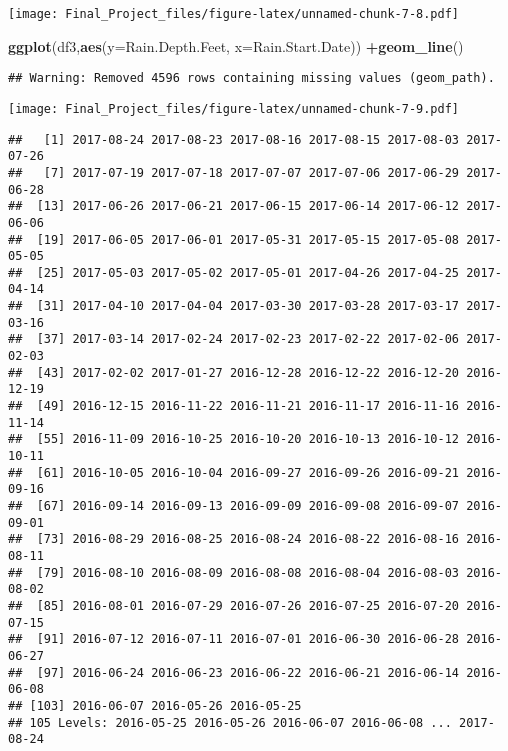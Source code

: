 \documentclass[
]{article}
\newenvironment{Shaded}{\begin{snugshade}}{\end{snugshade}}
\newcommand{\DataTypeTok}[1]{\textcolor[rgb]{0.13,0.29,0.53}{#1}}
\newcommand{\KeywordTok}[1]{\textcolor[rgb]{0.13,0.29,0.53}{\textbf{#1}}}
\newcommand{\NormalTok}[1]{#1}
\newcommand{\OperatorTok}[1]{\textcolor[rgb]{0.81,0.36,0.00}{\textbf{#1}}}
\begin{document}
\texttt{[image: Final\_Project\_files/figure-latex/unnamed-chunk-7-8.pdf]}

\begin{Shaded}
\begin{Highlighting}[]
\KeywordTok{ggplot}\NormalTok{(df3,}\KeywordTok{aes}\NormalTok{(}\DataTypeTok{y=}\NormalTok{Rain.Depth.Feet, }\DataTypeTok{x=}\NormalTok{Rain.Start.Date)) }\OperatorTok{+}\KeywordTok{geom_line}\NormalTok{()}
\end{Highlighting}
\end{Shaded}

\begin{verbatim}
## Warning: Removed 4596 rows containing missing values (geom_path).
\end{verbatim}

\texttt{[image: Final\_Project\_files/figure-latex/unnamed-chunk-7-9.pdf]}

\begin{Shaded}
\end{Shaded}

\begin{verbatim}
##   [1] 2017-08-24 2017-08-23 2017-08-16 2017-08-15 2017-08-03 2017-07-26
##   [7] 2017-07-19 2017-07-18 2017-07-07 2017-07-06 2017-06-29 2017-06-28
##  [13] 2017-06-26 2017-06-21 2017-06-15 2017-06-14 2017-06-12 2017-06-06
##  [19] 2017-06-05 2017-06-01 2017-05-31 2017-05-15 2017-05-08 2017-05-05
##  [25] 2017-05-03 2017-05-02 2017-05-01 2017-04-26 2017-04-25 2017-04-14
##  [31] 2017-04-10 2017-04-04 2017-03-30 2017-03-28 2017-03-17 2017-03-16
##  [37] 2017-03-14 2017-02-24 2017-02-23 2017-02-22 2017-02-06 2017-02-03
##  [43] 2017-02-02 2017-01-27 2016-12-28 2016-12-22 2016-12-20 2016-12-19
##  [49] 2016-12-15 2016-11-22 2016-11-21 2016-11-17 2016-11-16 2016-11-14
##  [55] 2016-11-09 2016-10-25 2016-10-20 2016-10-13 2016-10-12 2016-10-11
##  [61] 2016-10-05 2016-10-04 2016-09-27 2016-09-26 2016-09-21 2016-09-16
##  [67] 2016-09-14 2016-09-13 2016-09-09 2016-09-08 2016-09-07 2016-09-01
##  [73] 2016-08-29 2016-08-25 2016-08-24 2016-08-22 2016-08-16 2016-08-11
##  [79] 2016-08-10 2016-08-09 2016-08-08 2016-08-04 2016-08-03 2016-08-02
##  [85] 2016-08-01 2016-07-29 2016-07-26 2016-07-25 2016-07-20 2016-07-15
##  [91] 2016-07-12 2016-07-11 2016-07-01 2016-06-30 2016-06-28 2016-06-27
##  [97] 2016-06-24 2016-06-23 2016-06-22 2016-06-21 2016-06-14 2016-06-08
## [103] 2016-06-07 2016-05-26 2016-05-25
## 105 Levels: 2016-05-25 2016-05-26 2016-06-07 2016-06-08 ... 2017-08-24
\end{verbatim}
\end{document}
